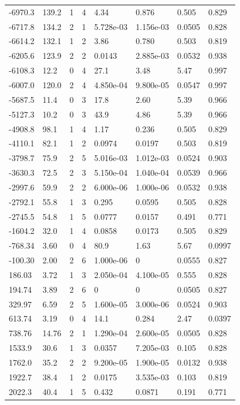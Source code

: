 \documentclass[preview]{standalone}
\begin{document}
{{\begin{tabular}{L{1.2cm}C{1.2cm} C{0.3cm}C{0.5cm} C{1.4cm}C{1.4cm} C{1.4cm}C{1.4cm}}
  -6970.3  &  139.2  & 1     &  4 &  4.34  & 0.876  & 0.505 &  0.829   \\ 
  -6717.8  &  134.2  & 2     &  1 &  5.728e-03  & 1.156e-03  & 0.0505 &  0.828   \\ 
  -6614.2  &  132.1  & 1     &  2 &  3.86  & 0.780  & 0.503 &  0.819   \\ 
  -6205.6  &  123.9  & 2     &  2 &  0.0143  & 2.885e-03  & 0.0532 &  0.938   \\ 
  -6108.3  &  12.2  & 0     &  4 &  27.1  & 3.48  & 5.47 &  0.997   \\ 
  -6007.0  &  120.0  & 2     &  4 &  4.850e-04  & 9.800e-05  & 0.0547 &  0.997   \\ 
  -5687.5  &  11.4  & 0     &  3 &  17.8  & 2.60  & 5.39 &  0.966   \\ 
  -5127.3  &  10.2  & 0     &  3 &  43.9  & 4.86  & 5.39 &  0.966   \\ 
  -4908.8  &  98.1  & 1     &  4 &  1.17  & 0.236  & 0.505 &  0.829   \\ 
  -4110.1  &  82.1  & 1     &  2 &  0.0974  & 0.0197  & 0.503 &  0.819   \\ 
  -3798.7  &  75.9  & 2     &  5 &  5.016e-03  & 1.012e-03  & 0.0524 &  0.903   \\ 
  -3630.3  &  72.5  & 2     &  3 &  5.150e-04  & 1.040e-04  & 0.0539 &  0.966   \\ 
  -2997.6  &  59.9  & 2     &  2 &  6.000e-06  & 1.000e-06  & 0.0532 &  0.938   \\ 
  -2792.1  &  55.8  & 1     &  3 &  0.295  & 0.0595  & 0.505 &  0.828   \\ 
  -2745.5  &  54.8  & 1     &  5 &  0.0777  & 0.0157  & 0.491 &  0.771   \\ 
  -1604.2  &  32.0  & 1     &  4 &  0.0858  & 0.0173  & 0.505 &  0.829   \\ 
  -768.34  &  3.60  & 0     &  4 &  80.9  & 1.63  & 5.67 &  0.0997   \\ 
  -100.30  &  2.00  & 2     &  6 &  1.000e-06  & 0  & 0.0555 &  0.827   \\ 
  186.03  &  3.72  & 1     &  3 &  2.050e-04  & 4.100e-05  & 0.555 &  0.828   \\ 
  194.74  &  3.89  & 2     &  6 &  0  & 0  & 0.0505 &  0.827   \\ 
  329.97  &  6.59  & 2     &  5 &  1.600e-05  & 3.000e-06  & 0.0524 &  0.903   \\ 
  613.74  &  3.19  & 0     &  4 &  14.1  & 0.284  & 2.47 &  0.0397   \\ 
  738.76  &  14.76  & 2     &  1 &  1.290e-04  & 2.600e-05  & 0.0505 &  0.828   \\ 
  1533.9  &  30.6  & 1     &  3 &  0.0357  & 7.205e-03  & 0.105 &  0.828   \\ 
  1762.0  &  35.2  & 2     &  2 &  9.200e-05  & 1.900e-05  & 0.0132 &  0.938   \\ 
  1922.7  &  38.4  & 1     &  2 &  0.0175  & 3.535e-03  & 0.103 &  0.819   \\ 
  2022.3  &  40.4  & 1     &  5 &  0.432  & 0.0871  & 0.191 &  0.771   \\ 
\hline 
\end{tabular} 

}}
\end{document}
